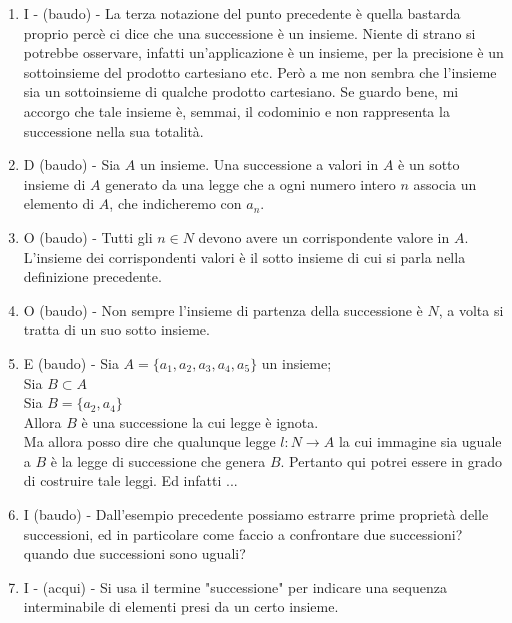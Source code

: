 \documentclass[]{article}
\begin{document}
\begin{enumerate}
\begin{enumerate}
		    \item I - (baudo) - La terza notazione del punto precedente \`e quella bastarda proprio perc\`e ci dice che una successione \`e un insieme. Niente di strano si potrebbe osservare, infatti un'applicazione \`e un insieme, per la precisione \`e un sottoinsieme del prodotto cartesiano etc. Per\`o a me non sembra che l'insieme \label{itm:n1} sia un sottoinsieme di qualche prodotto cartesiano. Se guardo bene, mi accorgo che tale insieme \`e, semmai, il codominio e non rappresenta la successione nella sua totalit\`a. 		  				     	
		    
		    \item D (baudo) - \label{itm:n2} Sia $A$ un insieme. Una successione a valori in $A$ \`e un sotto insieme di $A$ generato da una legge che a ogni numero intero $n$ associa un elemento di $A$, che indicheremo con $a_n$.
		    \item O (baudo) - Tutti gli $n \in N$ devono avere un corrispondente valore in $A$. L'insieme dei corrispondenti valori \`e il sotto insieme di cui si parla nella definizione precedente.
		    \item O (baudo) - Non sempre l'insieme di partenza della successione \`e $N$, a volta si tratta di un suo sotto insieme.
		    
		    \item E (baudo) - Sia $A = \{a_1, a_2, a_3, a_4, a_5\}$ un insieme; \\
				      Sia $B \subset A$ \\
				      Sia $B = \{a_2,a_4\}$ \\
				      Allora $B$ \`e una successione la cui legge \`e ignota. \\
				      Ma allora posso dire che qualunque legge $l:N \to A$ la cui immagine sia uguale a $B$ \`e la legge di successione che genera $B$. Pertanto qui potrei essere in grado di costruire tale leggi. Ed infatti ...
		    \item I (baudo) - Dall'esempio precedente possiamo estrarre prime propriet\`a delle successioni, ed in particolare come faccio a confrontare due successioni? quando due successioni sono uguali?
		    
		    \item I - (acqui) - Si usa il termine "successione" per indicare una sequenza interminabile di elementi presi da un certo insieme.


\end{enumerate}
\end{enumerate}
\end{document}
